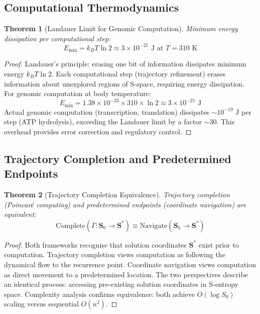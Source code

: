 \documentclass[11pt,a4paper]{article}
\newtheorem{theorem}{Theorem}[section]
\theoremstyle{remark}
\newcommand{\Scoord}{\mathbf{S}}
\begin{document}
\subsection{Computational Thermodynamics}

\begin{theorem}[Landauer Limit for Genomic Computation]
\label{thm:landauer_genomic}
Minimum energy dissipation per computational step:
\begin{equation}
E_{\text{min}} = k_BT\ln 2 \approx 3 \times 10^{-21} \text{ J at } T = 310 \text{ K}
\end{equation}
\end{theorem}

\begin{proof}
Landauer's principle: erasing one bit of information dissipates minimum energy $k_BT\ln 2$. Each computational step (trajectory refinement) erases information about unexplored regions of S-space, requiring energy dissipation. For genomic computation at body temperature:
\begin{equation}
E_{\text{min}} = 1.38 \times 10^{-23} \times 310 \times \ln 2 \approx 3 \times 10^{-21} \text{ J}
\end{equation}
Actual genomic computation (transcription, translation) dissipates $\sim 10^{-19}$ J per step (ATP hydrolysis), exceeding the Landauer limit by a factor $\sim 30$. This overhead provides error correction and regulatory control.
\end{proof}

\subsection{Trajectory Completion and Predetermined Endpoints}

\begin{theorem}[Trajectory Completion Equivalence]
\label{thm:trajectory_completion_equiv}
Trajectory completion (Poincaré computing) and predetermined endpoints (coordinate navigation) are equivalent:
\begin{equation}
\text{Complete}(\Gamma: \Scoord_0 \to \Scoord^*) \equiv \text{Navigate}(\Scoord_0 \to \Scoord^*)
\end{equation}
\end{theorem}

\begin{proof}
Both frameworks recognise that solution coordinates $\Scoord^*$ exist prior to computation. Trajectory completion views computation as following the dynamical flow to the recurrence point. Coordinate navigation views computation as direct movement to a predetermined location. The two perspectives describe an identical process: accessing pre-existing solution coordinates in S-entropy space. Complexity analysis confirms equivalence: both achieve $O(\log S_0)$ scaling versus sequential $O(n^2)$.
\end{proof}
\end{document}
